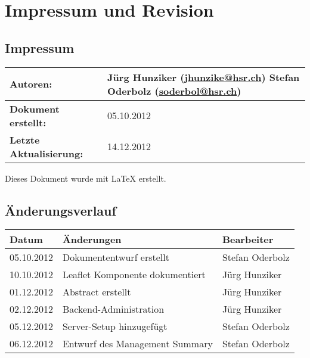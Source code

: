 \chapter*{Impressum und Revision}

\section*{Impressum}
\begin{table}[H] 
\centering 
\begin{tabular}{|p{0.35\twocelltabwidth}|p{0.65\twocelltabwidth}|}
\hline 
\textbf{Autoren:} & Jürg Hunziker (\url{jhunzike@hsr.ch}) \newline
Stefan Oderbolz (\url{soderbol@hsr.ch}) \\ 
\hline 
\textbf{Dokument erstellt:} & 05.10.2012 \\ 
\hline 
\textbf{Letzte Aktualisierung:} & 14.12.2012 \\ 
\hline 
\end{tabular}
\end{table}

Dieses Dokument wurde mit \LaTeX{} erstellt.

\section*{Änderungsverlauf}

\begin{longtable}{|p{0.15\threecelltabwidth}|p{0.65\threecelltabwidth}|p{0.2\threecelltabwidth}|}
\hline 
\textbf{Datum} & \textbf{Änderungen} & \textbf{Bearbeiter} \\ 
\hline 
05.10.2012 & Dokumententwurf erstellt & Stefan Oderbolz \\ 
\hline 
10.10.2012 & Leaflet Komponente dokumentiert & Jürg Hunziker \\ 
\hline 
01.12.2012 & Abstract erstellt & Jürg Hunziker \\ 
\hline 
02.12.2012 & Backend-Administration & Jürg Hunziker \\ 
\hline
05.12.2012 & Server-Setup hinzugefügt & Stefan Oderbolz \\ 
\hline 
06.12.2012 & Entwurf des Management Summary & Stefan Oderbolz \\ 
\hline 
\end{longtable} 